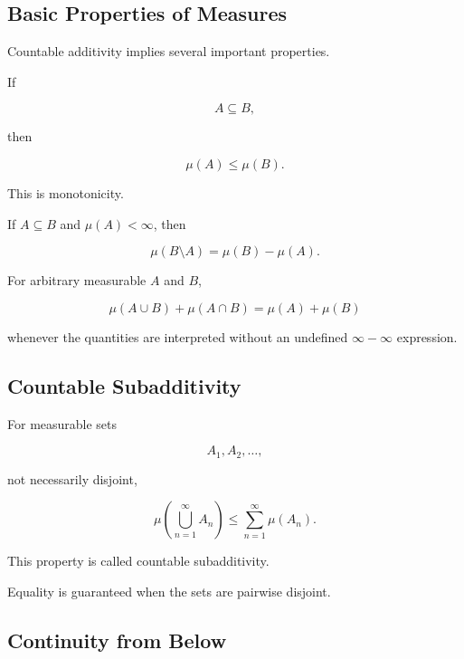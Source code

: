 \subsection{Basic Properties of Measures}
\label{subsec:basic-properties-measures}

Countable additivity implies several important properties.

If

\[
A\subseteq B,
\]

then

\[
\boxed{
\mu(A)\leq\mu(B).
}
\]

This is monotonicity.

If \(A\subseteq B\) and \(\mu(A)<\infty\), then

\[
\boxed{
\mu(B\setminus A)
=
\mu(B)-\mu(A).
}
\]

For arbitrary measurable \(A\) and \(B\),

\[
\boxed{
\mu(A\cup B)
+
\mu(A\cap B)
=
\mu(A)+\mu(B)
}
\]

whenever the quantities are interpreted without an undefined
\(\infty-\infty\) expression.

\subsection{Countable Subadditivity}
\label{subsec:countable-subadditivity}

For measurable sets

\[
A_1,A_2,\ldots,
\]

not necessarily disjoint,

\[
\boxed{
\mu\left(
\bigcup_{n=1}^{\infty}A_n
\right)
\leq
\sum_{n=1}^{\infty}\mu(A_n).
}
\]

This property is called countable subadditivity.

Equality is guaranteed when the sets are pairwise disjoint.

\subsection{Continuity from Below}
\label{subsec:continuity-from-below-measure}

